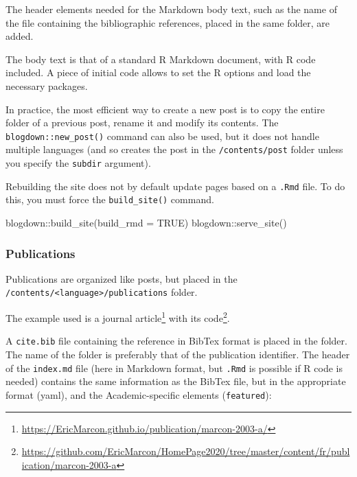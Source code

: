 \documentclass[
  12pt,
  american,
  a4paper,
  extrafontsizes,onecolumn,openright
  ]{memoir}
\newenvironment{Shaded}{\begin{snugshade}}{\end{snugshade}}
\newcommand{\AttributeTok}[1]{\textcolor[rgb]{0.77,0.63,0.00}{#1}}
\newcommand{\ConstantTok}[1]{\textcolor[rgb]{0.00,0.00,0.00}{#1}}
\newcommand{\FunctionTok}[1]{\textcolor[rgb]{0.00,0.00,0.00}{#1}}
\newcommand{\NormalTok}[1]{#1}
\newcommand{\SpecialCharTok}[1]{\textcolor[rgb]{0.00,0.00,0.00}{#1}}
\begin{document}
The header elements needed for the Markdown body text, such as the name of the file containing the bibliographic references, placed in the same folder, are added.

The body text is that of a standard R Markdown document, with R code included.
A piece of initial code allows to set the R options and load the necessary packages.

In practice, the most efficient way to create a new post is to copy the entire folder of a previous post, rename it and modify its contents.
The \texttt{blogdown::new\_post()} command can also be used, but it does not handle multiple languages (and so creates the post in the \texttt{/contents/post} folder unless you specify the \texttt{subdir} argument).

Rebuilding the site does not by default update pages based on a \texttt{.Rmd} file.
To do this, you must force the \texttt{build\_site()} command.

\scriptsize

\begin{Shaded}
\begin{Highlighting}[]
\NormalTok{blogdown}\SpecialCharTok{::}\FunctionTok{build\_site}\NormalTok{(}\AttributeTok{build\_rmd =} \ConstantTok{TRUE}\NormalTok{)}
\NormalTok{blogdown}\SpecialCharTok{::}\FunctionTok{serve\_site}\NormalTok{()}
\end{Highlighting}
\end{Shaded}

\normalsize

\hypertarget{publications}{%
\subsubsection{Publications}\label{publications}}

Publications are organized like posts, but placed in the \texttt{/contents/\textless{}language\textgreater{}}\break\texttt{/publications} folder.

The example used is a journal article\footnote{\url{https://EricMarcon.github.io/publication/marcon-2003-a/}} with its code\footnote{\url{https://github.com/EricMarcon/HomePage2020/tree/master/content/fr/publication/marcon-2003-a}}.

A \texttt{cite.bib} file containing the reference in BibTex format is placed in the folder.
The name of the folder is preferably that of the publication identifier.
The header of the \texttt{index.md} file (here in Markdown format, but \texttt{.Rmd} is possible if R code is needed) contains the same information as the BibTex file, but in the appropriate format (yaml), and the Academic-specific elements (\texttt{featured}):
\end{document}
